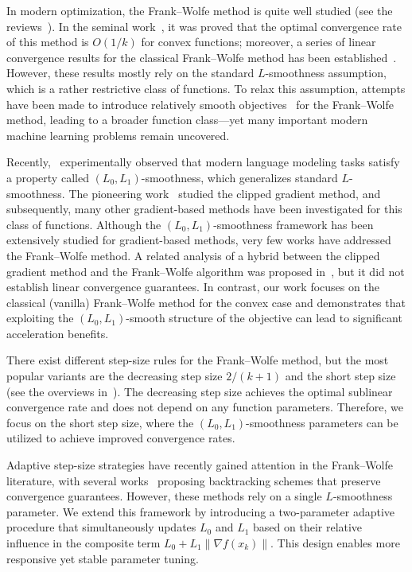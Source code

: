 \documentclass[runningheads]{llncs}
\begin{document}
	In modern optimization, the Frank--Wolfe method is quite well studied (see the reviews~\cite{bomze2021frank,braun2022conditional}). In the seminal work~\cite{levitin1966constrained}, it was proved that the optimal convergence rate of this method is $O(1/k)$ for convex functions; moreover, a series of linear convergence results for the classical Frank--Wolfe method has been established~\cite{bomze2021frank,braun2022conditional}. However, these results mostly rely on the standard $L$-smoothness assumption, which is a rather restrictive class of functions. To relax this assumption, attempts have been made to introduce relatively smooth objectives~\cite{vyguzov2025adaptive,takahashi2025fast} for the Frank--Wolfe method, leading to a broader function class—yet many important modern machine learning problems remain uncovered.
	
	Recently,~\cite{zhang2019gradient} experimentally observed that modern language modeling tasks satisfy a property called $(L_0, L_1)$-smoothness, which generalizes standard $L$-smoothness. The pioneering work~\cite{zhang2019gradient} studied the clipped gradient method, and subsequently, many other gradient-based methods have been investigated for this class of functions. Although the $(L_0,L_1)$-smoothness framework has been extensively studied for gradient-based methods, very few works have addressed the Frank--Wolfe method. A related analysis of a hybrid between the clipped gradient method and the Frank--Wolfe algorithm was proposed in~\cite{pethick2025generalized}, but it did not establish linear convergence guarantees. In contrast, our work focuses on the classical (vanilla) Frank--Wolfe method for the convex case and demonstrates that exploiting the $(L_0,L_1)$-smooth structure of the objective can lead to significant acceleration benefits.
	
	There exist different step-size rules for the Frank--Wolfe method, but the most popular variants are the decreasing step size $2/(k+1)$ and the short step size (see the overviews in~\cite{braun2022conditional,bomze2021frank}). The decreasing step size achieves the optimal sublinear convergence rate and does not depend on any function parameters. Therefore, we focus on the short step size, where the $(L_0, L_1)$-smoothness parameters can be utilized to achieve improved convergence rates.
	
	Adaptive step-size strategies have recently gained attention in the Frank--Wolfe literature, with several works~\cite{aivazian2023adaptive,pedregosa2020linearly,vyguzov2025adaptive,khademi2025adaptive} proposing backtracking schemes that preserve convergence guarantees. However, these methods rely on a single $L$-smoothness parameter. We extend this framework by introducing a two-parameter adaptive procedure that simultaneously updates $L_0$ and $L_1$ based on their relative influence in the composite term $L_0 + L_1 \|\nabla f(x_k)\|$. This design enables more responsive yet stable parameter tuning.
	
\end{document}

